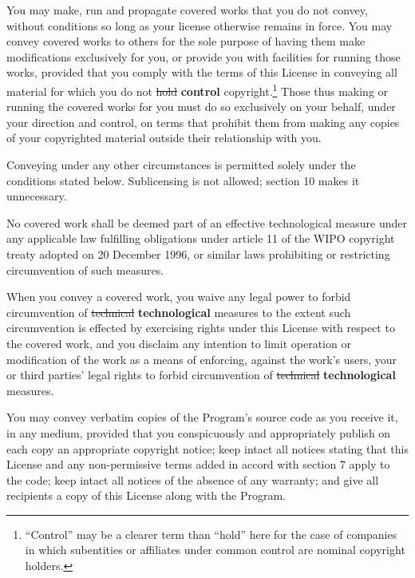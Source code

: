 \documentclass[11pt]{article}
\newcounter{v2section}
\newcounter{v3section}
\begin{document}
  You may make, run and propagate covered works that you do not convey,
without conditions so long as your license otherwise remains in force.
You may convey covered works to others for the sole purpose of having
them make modifications exclusively for you, or provide you with
facilities for running those works, provided that you comply with the
terms of this License in conveying all material for which you do not
\sout{hold} \textbf{control} copyright.\footnote{``Control'' may be a
clearer term than ``hold'' here for the case of companies in which
subentities or affiliates under common control are nominal copyright
holders.}  Those thus making or running the covered works for you must
do so exclusively on your behalf, under your direction and control, on
terms that prohibit them from making any copies of your copyrighted
material outside their relationship with you.

  Conveying under any other circumstances is permitted solely under
the conditions stated below.  Sublicensing is not allowed; section 10
makes it unnecessary.


  No covered work shall be deemed part of an effective technological
measure under any applicable law fulfilling obligations under article
11 of the WIPO copyright treaty adopted on 20 December 1996, or
similar laws prohibiting or restricting circumvention of such
measures.

  When you convey a covered work, you waive any legal power to forbid
circumvention of \sout{technical} \textbf{technological} measures to the
extent such circumvention is effected by exercising rights under this
License with respect to the covered work, and you disclaim any intention
to limit operation or modification of the work as a means of enforcing,
against the work's users, your or third parties' legal rights to forbid
circumvention of \sout{technical} \textbf{technological}
measures.


  You may convey verbatim copies of the Program's source code as you
receive it, in any medium, provided that you conspicuously and
appropriately publish on each copy an appropriate copyright notice; keep
intact all notices stating that this License and any non-permissive
terms added in accord with section 7 apply to the code; keep intact all
notices of the absence of any warranty; and give all recipients a copy
of this License along with the Program.
\end{document}
